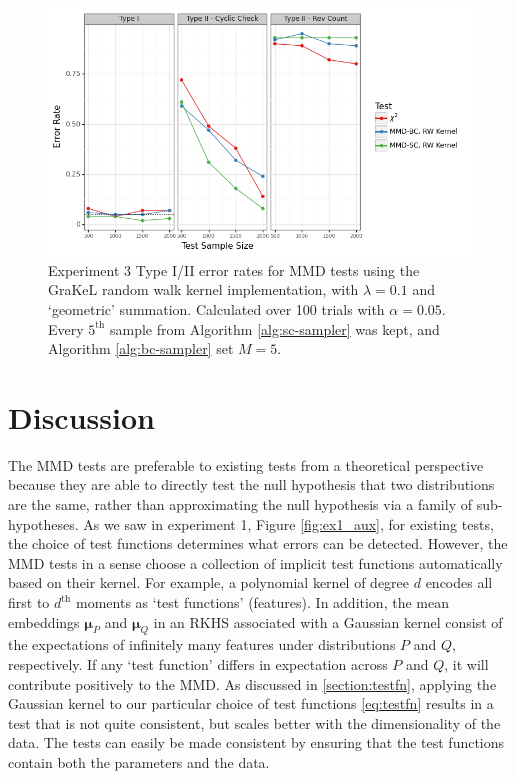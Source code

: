 \documentclass[a4paper,11pt]{article}
\begin{document}
\begin{figure}[H]
    \centering
    \includegraphics[width=\textwidth]{figures/graph_random_walk.png}
    \caption{Experiment 3 Type I/II error rates for MMD tests using the GraKeL \cite{siglidis_grakel_2020} random walk kernel implementation, with $\lambda=0.1$ and `geometric' summation. Calculated over 100 trials with $\alpha=0.05$. Every $5^{\text{th}}$ sample from Algorithm \ref{alg:sc-sampler} was kept, and Algorithm \ref{alg:bc-sampler} set $M=5$.}
    \label{fig:ex3_rw}
\end{figure}

\section{Discussion}
\label{section:discussion}
The MMD tests are preferable to existing tests from a theoretical perspective because they are able to directly test the null hypothesis that two distributions are the same, rather than approximating the null hypothesis via a family of sub-hypotheses. As we saw in experiment 1, Figure \ref{fig:ex1_aux}, for existing tests, the choice of test functions determines what errors can be detected. However, the MMD tests in a sense choose a collection of implicit test functions automatically based on their kernel. For example, a polynomial kernel of degree $d$ encodes all first to $d^{\text{th}}$ moments as `test functions' (features). In addition, the mean embeddings $\mathbf{\mu}_{P}$ and $\mathbf{\mu}_{Q}$ in an RKHS associated with a Gaussian kernel consist of the expectations of infinitely many features under distributions $P$ and $Q$, respectively. If any `test function' differs in expectation across $P$ and $Q$, it will contribute positively to the MMD. As discussed in \ref{section:testfn}, applying the Gaussian kernel to our particular choice of test functions \eqref{eq:testfn} results in a test that is not quite consistent, but scales better with the dimensionality of the data. The tests can easily be made consistent by ensuring that the test functions contain both the parameters and the data.
\end{document}
